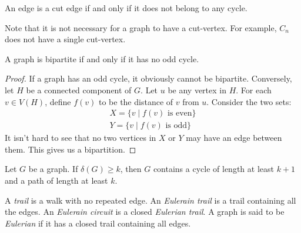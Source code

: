 \begin{proposition}
    An edge is a cut edge if and only if it does not belong to any cycle.
\end{proposition}

Note that it is not necessary for a graph to have a cut-vertex. For example, $C_n$ does not have a single cut-vertex.

\begin{theorem}[K\"onig]
    A graph is bipartite if and only if it has no odd cycle.
\end{theorem}
\begin{proof}
    If a graph has an odd cycle, it obviously cannot be bipartite. Conversely, let $H$ be a connected component of $G$. Let $u$ be any vertex in $H$. For each $v\in V(H)$, define $f(v)$ to be the distance of $v$ from $u$. Consider the two sets:
    \begin{align*}
        X = \{v\mid f(v) \text{ is even}\}\\
        Y = \{v\mid f(v) \text{ is odd}\}
    \end{align*}
    It isn't hard to see that no two vertices in $X$ or $Y$ may have an edge between them. This gives us a bipartition.
\end{proof}

\begin{proposition}
    Let $G$ be a graph. If $\delta(G)\ge k$, then $G$ contains a cycle of length at least $k + 1$ and a path of length at least $k$.
\end{proposition}

\begin{definition}
    A \textit{trail} is a walk with no repeated edge. An \textit{Eulerain trail} is a trail containing all the edges. An \textit{Eulerain circuit} is a closed \textit{Eulerian trail}. A graph is said to be \textit{Eulerian} if it has a closed trail containing all edges.
\end{definition}

